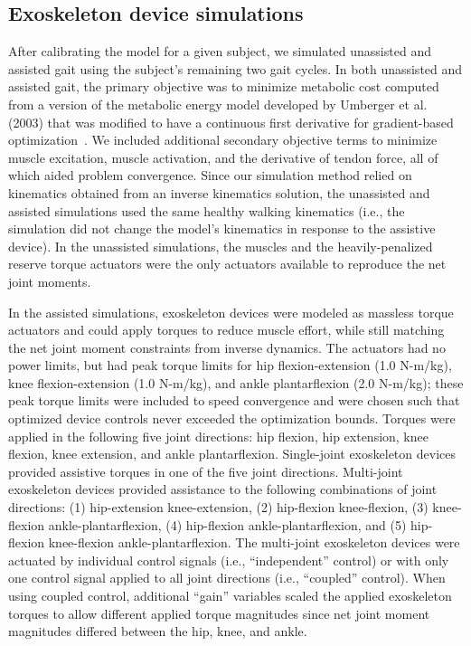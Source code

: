 \documentclass[10pt,letterpaper]{article}
\begin{document}
\subsection*{Exoskeleton device simulations}
After calibrating the model for a given subject, we simulated unassisted and assisted gait using the subject’s remaining two gait cycles. In both unassisted and assisted gait, the primary objective was to minimize metabolic cost computed from a version of the metabolic energy model developed by Umberger et al. (2003) that was modified to have a continuous first derivative for gradient-based optimization~\cite{Umberger:2003, Koelewijn:2018}. We included additional secondary objective terms to minimize muscle excitation, muscle activation, and the derivative of tendon force, all of which aided problem convergence. Since our simulation method relied on kinematics obtained from an inverse kinematics solution, the unassisted and assisted simulations used the same healthy walking kinematics (i.e., the simulation did not change the model's kinematics in response to the assistive device). In the unassisted simulations, the muscles and the heavily-penalized reserve torque actuators were the only actuators available to reproduce the net joint moments.

In the assisted simulations, exoskeleton devices were modeled as massless torque actuators and could apply torques to reduce muscle effort, while still matching the net joint moment constraints from inverse dynamics. The actuators had no power limits, but had peak torque limits for hip flexion-extension (1.0 N-m/kg), knee flexion-extension (1.0 N-m/kg), and ankle plantarflexion (2.0 N-m/kg); these peak torque limits were included to speed convergence and were chosen such that optimized device controls never exceeded the optimization bounds. Torques were applied in the following five joint directions: hip flexion, hip extension, knee flexion, knee extension, and ankle plantarflexion. Single-joint exoskeleton devices provided assistive torques in one of the five joint directions. Multi-joint exoskeleton devices provided assistance to the following combinations of joint directions: (1) hip-extension knee-extension, (2) hip-flexion knee-flexion, (3) knee-flexion ankle-plantarflexion, (4) hip-flexion ankle-plantarflexion, and (5) hip-flexion knee-flexion ankle-plantarflexion. The multi-joint exoskeleton devices were actuated by individual control signals (i.e., ``independent'' control) or with only one control signal applied to all joint directions (i.e., ``coupled'' control). When using coupled control, additional ``gain'' variables scaled the applied exoskeleton torques to allow different applied torque magnitudes since net joint moment magnitudes differed between the hip, knee, and ankle.
\end{document}
